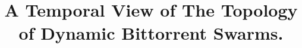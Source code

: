 \documentclass[10pt,conference,letterpaper]{IEEEtran}
\begin{document}


%
\title{A Temporal View of The Topology of Dynamic Bittorrent Swarms.}




\end{document}
